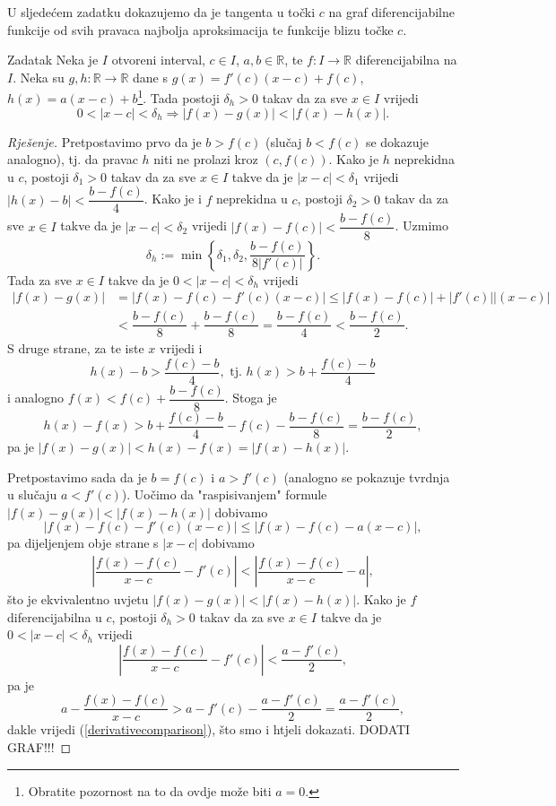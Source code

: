 U sljedećem zadatku dokazujemo da je tangenta u točki \(c\) na graf diferencijabilne funkcije od svih pravaca najbolja aproksimacija te funkcije blizu točke \(c\).
\begin{exercise}{Zadatak}
Neka je \(I\) otvoreni interval, \(c\in I\), \(a, b\in \mathbb{R}\), te \(f : I \to \mathbb{R}\) diferencijabilna na \(I\). Neka su \(g, h : \mathbb{R}\to \mathbb{R}\) dane s \(g(x)=f'(c)(x-c)+f(c)\), \(h(x)=a(x-c)+b\)\footnote{Obratite pozornost na to da ovdje može biti \(a=0\).}. Tada postoji \(\delta_h>0\) takav da za sve \(x\in I\) vrijedi
\[0<|x-c|<\delta_h\Rightarrow |f(x)-g(x)|<|f(x)-h(x)|.\]
\end{exercise}
\begin{proof}[Rješenje]
Pretpostavimo prvo da je $b> f(c)$ (slučaj $b<f(c)$ se dokazuje analogno), tj. da pravac $h$ niti ne prolazi kroz $\left(c, f(c)\right)$. Kako je $h$ neprekidna u $c$, postoji $\delta_1>0$ takav da za sve $x\in I$ takve da je $\lvert x-c\rvert<\delta_1$ vrijedi $\lvert h(x)-b\rvert<\dfrac{b-f(c)}{4}$. Kako je i $f$ neprekidna u $c$, postoji $\delta_2>0$ takav da za sve $x\in I$ takve da je $\lvert x-c\rvert<\delta_2$ vrijedi $\lvert f(x)-f(c)\rvert<\dfrac{b-f(c)}{8}$. Uzmimo 
$$\delta_h:=\min{\left\{\delta_1, \delta_2, \dfrac{b-f(c)}{8\lvert f'(c)\rvert}\right\}}.$$
Tada za sve $x\in I$ takve da je $0<\lvert x-c\rvert<\delta_h$ vrijedi
\begin{align*}
\left\lvert f(x)-g(x)\right\rvert&=\left\lvert f(x)-f(c)-f'(c)(x-c)\right\rvert\leq \left\lvert f(x)-f(c)\right\rvert+\left\lvert f'(c)\right\rvert\left\lvert(x-c)\right\rvert\\
&<\dfrac{b-f(c)}{8}+\dfrac{b-f(c)}{8}=\dfrac{b-f(c)}{4}<\dfrac{b-f(c)}{2}.
\end{align*}
S druge strane, za te iste $x$ vrijedi i
$$h(x)-b>\dfrac{f(c)-b}{4}, \text{ tj. } h(x)>b+\dfrac{f(c)-b}{4}$$
i analogno $f(x)<f(c)+\dfrac{b-f(c)}{8}$. Stoga je
$$h(x)-f(x)>b+\dfrac{f(c)-b}{4}-f(c)-\dfrac{b-f(c)}{8}=\dfrac{b-f(c)}{2},$$
pa je $\left\lvert f(x)-g(x)\right\rvert<h(x)-f(x)=\lvert f(x)-h(x)\rvert$.

Pretpostavimo sada da je $b=f(c)$ i $a> f'(c)$ (analogno se pokazuje tvrdnja u slučaju $a<f'(c)$). Uočimo da "raspisivanjem" formule $|f(x)-g(x)|<|f(x)-h(x)|$ dobivamo
$$\left\lvert f(x)-f(c)-f'(c)(x-c)\right\rvert\leq \left\lvert f(x)-f(c)-a(x-c)\right\rvert,$$
pa dijeljenjem obje strane s $\lvert x-c\rvert$ dobivamo
\begin{gather}
\label{derivativecomparison}
\left\lvert \dfrac{f(x)-f(c)}{x-c}-f'(c)\right\rvert<\left\lvert \dfrac{f(x)-f(c)}{x-c}-a\right\rvert,
\end{gather}
što je ekvivalentno uvjetu $|f(x)-g(x)|<|f(x)-h(x)|$.
Kako je $f$ diferencijabilna u $c$, postoji $\delta_h>0$ takav da za sve $x\in I$ takve da je $0<\lvert x-c\rvert<\delta_h$ vrijedi $$\left\lvert \dfrac{f(x)-f(c)}{x-c}-f'(c)\right\rvert<\dfrac{a-f'(c)}{2},$$
pa je
$$a-\dfrac{f(x)-f(c)}{x-c}>a-f'(c)-\dfrac{a-f'(c)}{2}=\dfrac{a-f'(c)}{2},$$
dakle vrijedi (\ref{derivativecomparison}), što smo i htjeli dokazati. DODATI GRAF!!!
\end{proof}
